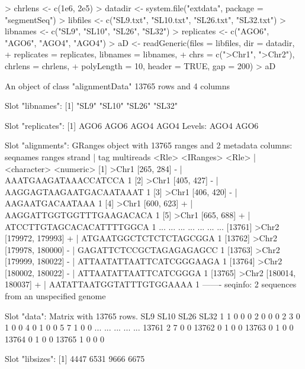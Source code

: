 \documentclass[a4paper]{article}
\begin{document}
\begin{Schunk}
\begin{Sinput}
> chrlens <- c(1e6, 2e5)
> datadir <- system.file("extdata", package = "segmentSeq")
> libfiles <- c("SL9.txt", "SL10.txt", "SL26.txt", "SL32.txt")
> libnames <- c("SL9", "SL10", "SL26", "SL32")
> replicates <- c("AGO6", "AGO6", "AGO4", "AGO4")
> aD <- readGeneric(files = libfiles, dir = datadir,
+                   replicates = replicates, libnames = libnames, 
+                   chrs = c(">Chr1", ">Chr2"), chrlens = chrlens,
+                   polyLength = 10, header = TRUE, gap = 200)
> aD
\end{Sinput}
\begin{Soutput}
An object of class "alignmentData"
13765 rows and 4 columns

Slot "libnames":
[1] "SL9"  "SL10" "SL26" "SL32"

Slot "replicates":
[1] AGO6 AGO6 AGO4 AGO4
Levels: AGO4 AGO6

Slot "alignments":
GRanges object with 13765 ranges and 2 metadata columns:
          seqnames           ranges strand   |                      tag multireads
             <Rle>        <IRanges>  <Rle>   |              <character>  <numeric>
      [1]    >Chr1       [265, 284]      -   |     AAATGAAGATAAACCATCCA          1
      [2]    >Chr1       [405, 427]      -   |  AAGGAGTAAGAATGACAATAAAT          1
      [3]    >Chr1       [406, 420]      -   |          AAGAATGACAATAAA          1
      [4]    >Chr1       [600, 623]      +   | AAGGATTGGTGGTTTGAAGACACA          1
      [5]    >Chr1       [665, 688]      +   | ATCCTTGTAGCACACATTTTGGCA          1
      ...      ...              ...    ... ...                      ...        ...
  [13761]    >Chr2 [179972, 179993]      +   |   ATGAATGGCTCTCTCTAGCGGA          1
  [13762]    >Chr2 [179978, 180000]      -   |  GAGATTCTCCGCTAGAGAGAGCC          1
  [13763]    >Chr2 [179999, 180022]      -   | ATTAATATTAATTCATCGGGAAGA          1
  [13764]    >Chr2 [180002, 180022]      -   |    ATTAATATTAATTCATCGGGA          1
  [13765]    >Chr2 [180014, 180037]      +   | AATATTAATGGTATTTGTGGAAAA          1
  -------
  seqinfo: 2 sequences from an unspecified genome

Slot "data":
Matrix with  13765  rows.
      SL9 SL10 SL26 SL32
1       1    0    0    0
2       0    0    0    2
3       0    1    0    0
4       0    1    0    0
5       7    1    0    0
...   ...  ...  ...  ...
13761   2    7    0    0
13762   0    1    0    0
13763   0    1    0    0
13764   0    1    0    0
13765   1    0    0    0

Slot "libsizes":
[1] 4447 6531 9666 6675
\end{Soutput}
\end{Schunk}
\end{document}
